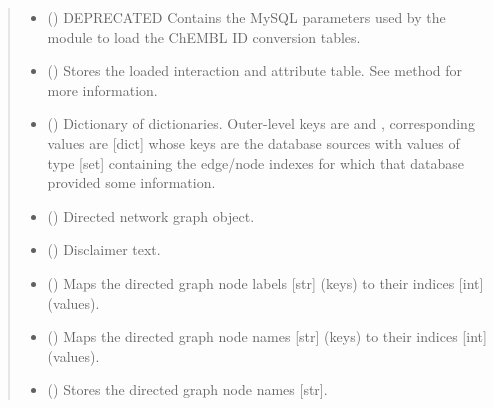 \documentclass[letterpaper,10pt,english]{sphinxmanual}
\begin{document}
\begin{fulllineitems}
\begin{quote}
\begin{description}
\begin{itemize}
\item {} 
 () \textendash{} DEPRECATED Contains the MySQL parameters used by the
 module to load the ChEMBL ID conversion
tables.

\item {} 
 () \textendash{} Stores the loaded interaction and attribute table. See
{\hyperref[\detokenize{reference:pypath.main.PyPath.read_data_file}]{}} method for more information.

\item {} 
 () \textendash{} Dictionary of dictionaries. Outer-level keys are  and
, corresponding values are {[}dict{]} whose keys are the
database sources with values of type {[}set{]} containing the
edge/node indexes for which that database provided some
information.

\item {} 
 () \textendash{} Directed network graph object.

\item {} 
 () \textendash{} Disclaimer text.

\item {} 
 () \textendash{} Maps the directed graph node labels {[}str{]} (keys) to their
indices {[}int{]} (values).

\item {} 
 () \textendash{} Maps the directed graph node names {[}str{]} (keys) to their indices
{[}int{]} (values).

\item {} 
 () \textendash{} Stores the directed graph node names {[}str{]}.


\end{itemize}
\end{description}
\end{quote}
\end{fulllineitems}
\end{document}
